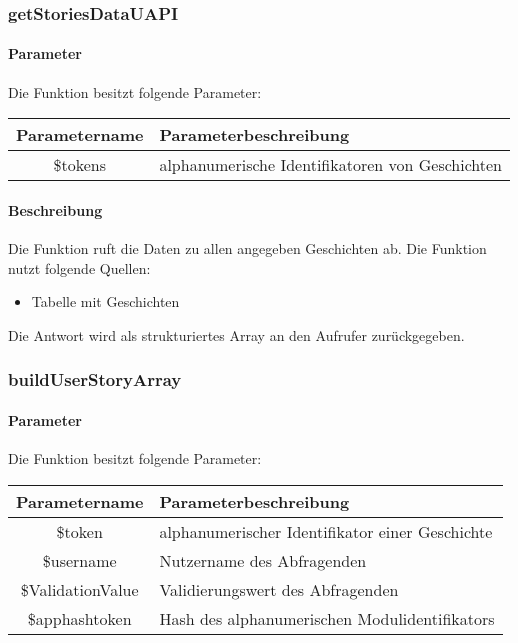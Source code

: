 \subsubsection{getStoriesDataUAPI}
\paragraph{Parameter} Die Funktion besitzt folgende Parameter:
\begin{table}[H]
	\begin{tabular}{|c|p{11cm}|}
		\hline
		\textbf{Parametername} & \textbf{Parameterbeschreibung} \\ \hline
		\$tokens & alphanumerische Identifikatoren von Geschichten \\ \hline
	\end{tabular}
\end{table}
\paragraph{Beschreibung} Die Funktion ruft die Daten zu allen angegeben Geschichten ab. Die Funktion nutzt folgende Quellen:
\begin{itemize}
	\item Tabelle mit Geschichten
\end{itemize}
Die Antwort wird als strukturiertes Array an den Aufrufer zurückgegeben.
\subsubsection{buildUserStoryArray}
\paragraph{Parameter} Die Funktion besitzt folgende Parameter:
\begin{table}[H]
	\begin{tabular}{|c|p{11cm}|}
		\hline
		\textbf{Parametername} & \textbf{Parameterbeschreibung} \\ \hline
		\$token           & alphanumerischer Identifikator einer Geschichte \\ \hline
		\$username        & Nutzername des Abfragenden \\ \hline
		\$ValidationValue & Validierungswert des Abfragenden \\ \hline
		\$apphashtoken    & Hash des alphanumerischen Modulidentifikators \\ \hline
	\end{tabular}
\end{table}
